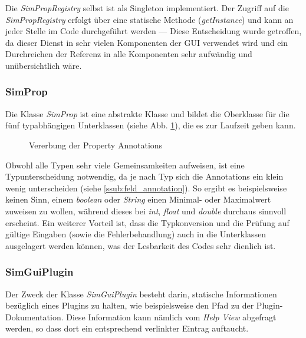 \documentclass[a4paper, 11pt]{article} %
\begin{document}
Die \emph{SimPropRegistry} selbst ist als Singleton implementiert. Der Zugriff auf die \emph{SimPropRegistry} erfolgt über eine statische Methode (\emph{getInstance}) und kann an jeder Stelle im Code durchgeführt werden --- Diese Entscheidung wurde getroffen, da dieser Dienst in sehr vielen Komponenten der GUI verwendet wird und ein Durchreichen der Referenz in alle Komponenten sehr aufwändig und unübersichtlich wäre. 

\subsubsection{SimProp} %
\label{ssub:simprop}
Die Klasse \emph{SimProp} ist eine abstrakte Klasse und bildet die Oberklasse für die fünf typabhängigen Unterklassen (siehe Abb. \ref{fig:field_annotation}), die es zur Laufzeit geben kann.

\begin{figure}[!htp]
\caption{Vererbung der Property Annotations}
\label{fig:field_annotation}
\end{figure}

 Obwohl alle Typen sehr viele Gemeinsamkeiten aufweisen, ist eine Typunterscheidung notwendig, da je nach Typ sich die Annotations ein klein wenig unterscheiden (siehe \ref{ssub:feld_annotation}). So ergibt es beispielsweise keinen Sinn, einem \emph{boolean} oder \emph{String} einen Minimal- oder Maximalwert zuweisen zu wollen, während dieses bei \emph{int}, \emph{float} und \emph{double} durchaus sinnvoll erscheint. Ein weiterer Vorteil ist, dass die Typkonversion und die Prüfung auf gültige Eingaben (sowie die Fehlerbehandlung) auch in die Unterklassen ausgelagert werden können, was der Lesbarkeit des Codes sehr dienlich ist. 

\subsubsection{SimGuiPlugin} %
\label{ssub:simprop}
Der Zweck der Klasse \emph{SimGuiPlugin} besteht darin, statische Informationen bezüglich eines Plugins zu halten, wie beispielsweise den Pfad zu der Plugin-Dokumentation. Diese Information kann nämlich vom \emph{Help View} abgefragt werden, so dass dort ein entsprechend verlinkter Eintrag auftaucht.  
\end{document}
